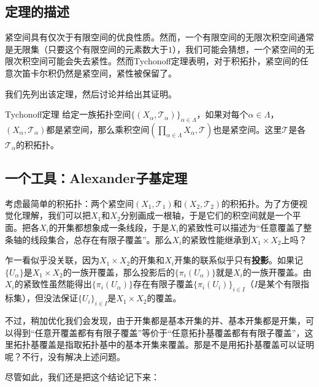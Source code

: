 

\subsection{定理的描述}

紧空间具有仅次于有限空间的优良性质。然而，一个有限空间的无限次积空间通常是无限集（只要这个有限空间的元素数大于$1$），我们可能会猜想，一个紧空间的无限次积空间可能会失去紧性。然而Tychonoff定理表明，对于积拓扑，紧空间的任意次笛卡尔积仍然是紧空间，紧性被保留了。

我们先列出该定理，然后讨论并给出其证明。

\begin{theorem}{Tychonoff定理}
给定一族拓扑空间$\{(X_\alpha, \mathcal{T}_\alpha)\}_{\alpha\in \Lambda}$，如果对每个$\alpha\in\Lambda$，$(X_\alpha, \mathcal{T}_\alpha)$都是紧空间，那么乘积空间$(\prod_{\alpha\in\Lambda}X_\alpha, \mathcal{T})$也是紧空间。这里$\mathcal{T}$是各$\mathcal{T}_\alpha$的积拓扑。
\end{theorem}



\subsection{一个工具：Alexander子基定理}

考虑最简单的积拓扑：两个紧空间$(X_1, \mathcal{T}_1)$和$(X_2, \mathcal{T}_2)$的积拓扑。为了方便视觉化理解，我们可以把$X_1$和$X_2$分别画成一根轴，于是它们的积空间就是一个平面。把各$X_i$的开集都想象成一条线段，于是$X_i$的紧致性可以描述为“任意覆盖了整条轴的线段集合，总存在有限子覆盖”。那么$X_i$的紧致性能继承到$X_1\times X_2$上吗？

乍一看似乎没关联，因为$X_1\times X_2$的开集和$X_i$开集的联系似乎只有\textbf{投影}。如果记$\{U_\alpha\}$是$X_1\times X_2$的一族开覆盖，那么投影后的$\{\pi_i(U_\alpha)\}$就是$X_i$的一族开覆盖。由$X_i$的紧致性虽然能得出$\{\pi_i(U_\alpha)\}$存在有限子覆盖$\{\pi_i(U_i)\}_{i\in I}$（$I$是某个有限指标集），但没法保证$\{U_i\}_{i\in I}$是$X_1\times X_2$的覆盖。

不过，稍加优化我们会发现，由于开集都是基本开集的并、基本开集都是开集，可以得到“任意开覆盖都有有限子覆盖”等价于“任意拓扑基覆盖都有有限子覆盖”，这里拓扑基覆盖是指取拓扑基中的基本开集来覆盖。那是不是用拓扑基覆盖可以证明呢？不行，没有解决上述问题。

尽管如此，我们还是把这个结论记下来：

